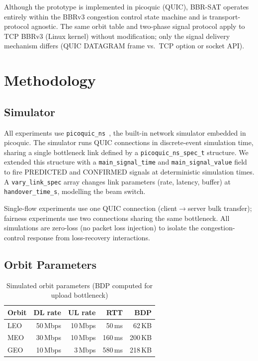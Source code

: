\documentclass[conference]{IEEEtran}
\begin{document}
Although the prototype is implemented in picoquic (QUIC), BBR-SAT operates
entirely within the BBRv3 congestion control state machine and is
transport-protocol agnostic.
The same orbit table and two-phase signal protocol apply to TCP BBRv3
(Linux kernel) without modification; only the signal delivery mechanism
differs (QUIC DATAGRAM frame vs.\ TCP option or socket API).

\section{Methodology}
\label{sec:methodology}

\subsection{Simulator}

All experiments use \texttt{picoquic\_ns}~\cite{huitema2023picoquic},
the built-in network simulator embedded in picoquic.
The simulator runs QUIC connections in discrete-event simulation time,
sharing a single bottleneck link defined by a \texttt{picoquic\_ns\_spec\_t}
structure.
We extended this structure with a \texttt{main\_signal\_time} and
\texttt{main\_signal\_value} field to fire PREDICTED and CONFIRMED signals
at deterministic simulation times.
A \texttt{vary\_link\_spec} array changes link parameters (rate, latency,
buffer) at \texttt{handover\_time\_s}, modelling the beam switch.

Single-flow experiments use one QUIC connection (client$\to$server bulk
transfer); fairness experiments use two connections sharing the same
bottleneck.
All simulations are zero-loss (no packet loss injection) to isolate the
congestion-control response from loss-recovery interactions.

\subsection{Orbit Parameters}
\label{sec:orbits}

\begin{table}[t]
\centering
\caption{Simulated orbit parameters (BDP computed for upload bottleneck)}
\label{tab:orbits}
\small
\begin{tabular}{lrrrr}
\toprule
Orbit & DL rate & UL rate & RTT  & BDP \\
\midrule
LEO   & 50\,Mbps & 10\,Mbps & 50\,ms  & 62\,KB \\
MEO   & 30\,Mbps & 10\,Mbps & 160\,ms & 200\,KB \\
GEO   & 10\,Mbps & 3\,Mbps  & 580\,ms & 218\,KB \\
\bottomrule
\end{tabular}
\end{table}
\end{document}
